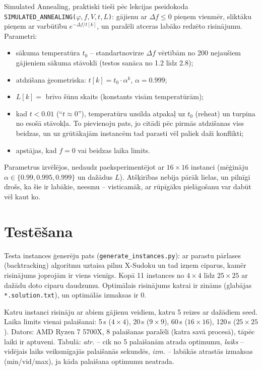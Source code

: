 \documentclass[11pt,a4paper]{article}
\begin{document}
Simulated Annealing, praktiski tieši pēc lekcijas pseidokoda \texttt{SIMULATED\_ANNEALING($\varphi, f, V, t, L$)}:
gājienu ar $\Delta f \le 0$ pieņem vienmēr, sliktāku pieņem ar varbūtību $e^{-\Delta f / t[k]}$, un
paralēli atceras labāko redzēto risinājumu. Parametri:
\begin{itemize}
  \item sākuma temperatūra $t_0$ -- standartnovirze $\Delta f$ vērtībām no 200 nejaušiem gājieniem
        sākuma stāvoklī (testos sanāca no 1.2 līdz 2.8);
  \item atdzišana ģeometriska: $t[k] = t_0 \cdot \alpha^k$, $\alpha = 0.999$;
  \item $L[k] = $ brīvo šūnu skaits (konstants visām temperatūrām);
  \item kad $t < 0.01$ (``$t\approx0$''), temperatūru uzsilda atpakaļ uz $t_0$ (reheat) un turpina
        no esošā stāvokļa. To pievienoju pats, jo citādi pēc pirmās atdzišanas viss beidzas, un uz grūtākajām
        instancēm tad parasti vēl paliek daži konflikti;
  \item apstājas, kad $f=0$ vai beidzas laika limits.
\end{itemize}
Parametrus izvēlējos, nedaudz paeksperimentējot ar $16\times16$ instanci (mēģināju $\alpha \in
\{0.99, 0.995, 0.999\}$ un dažādus $L$). Atšķirības nebija pārāk lielas, un pilnīgi drošs, ka šie ir
labākie, neesmu -- visticamāk, ar rūpīgāku pielāgošanu var dabūt vēl kaut ko.

\section{Testēšana}

Testa instances ģenerēju pats (\texttt{generate\_instances.py}): ar parastu pārlases (backtracking)
algoritmu uztaisa pilnu X-Sudoku un tad izņem ciparus, kamēr risinājums joprojām ir viens vienīgs.
Kopā 11 instances no $4\times4$ līdz $25\times25$ ar dažādu doto ciparu daudzumu. Optimālais risinājums
katrai ir zināms (glabājas \texttt{*.solution.txt}), un optimālās izmaksas ir 0.

Katru instanci risināju ar abiem gājienu veidiem, katru 5 reizes ar dažādiem seed. Laika limits vienai
palaišanai: 5\,s ($4\times4$), 20\,s ($9\times9$), 60\,s ($16\times16$), 120\,s ($25\times25$).
Dators: AMD Ryzen 7 5700X, 8 palaišanas paralēli (katra savā procesā), tāpēc laiki ir aptuveni.
Tabulā: \textit{atr.} -- cik no 5 palaišanām atrada optimumu, \textit{laiks} -- vidējais laiks
veiksmīgajās palaišanās sekundēs, \textit{izm.} -- labākās atrastās izmaksas (min/vid/max), ja kāda
palaišana optimumu neatrada.
\end{document}

